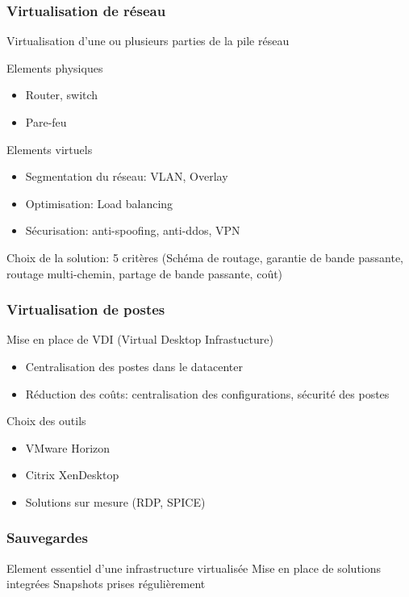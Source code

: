 \documentclass{beamer}
\begin{document}
\begin{frame}
\frametitle{Virtualisation de réseau}

Virtualisation d'une ou plusieurs parties de la pile réseau

Elements physiques
\begin{itemize}
    \item Router, switch
    \item Pare-feu
\end{itemize}
Elements virtuels
\begin{itemize}
    \item Segmentation du réseau: VLAN, Overlay
    \item Optimisation: Load balancing
    \item Sécurisation: anti-spoofing, anti-ddos, VPN
\end{itemize}

Choix de la solution: 5 critères (Schéma de routage, garantie de bande passante, routage multi-chemin, partage de bande passante, coût)

\end{frame}


\begin{frame}
\frametitle{Virtualisation de postes}

Mise en place de VDI (Virtual Desktop Infrastucture)

\begin{itemize}
    \item Centralisation des postes dans le datacenter
    \item Réduction des coûts: centralisation des configurations, sécurité des postes
\end{itemize}

Choix des outils
\begin{itemize}
    \item VMware Horizon
    \item Citrix XenDesktop
    \item Solutions sur mesure (RDP, SPICE)
\end{itemize}


\end{frame}


\begin{frame}
\frametitle{Sauvegardes}
Element essentiel d'une infrastructure virtualisée
\medbreak
\medbreak
Mise en place de solutions integrées
\medbreak
\medbreak
Snapshots prises régulièrement

\end{frame}
\end{document}

